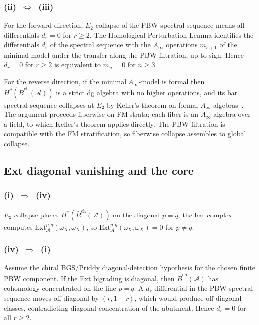 \documentclass[11pt,reqno]{amsart}
\theoremstyle{definition}
\theoremstyle{remark}
\newcommand{\cA}{\mathcal{A}}
\newcommand{\barBgeom}{\bar{B}^{\mathrm{ch}}}
\newcommand{\Ext}{\mathrm{Ext}}
\numberwithin{equation}{section}
\begin{document}
\subsubsection*{\textup{(ii)}~$\Leftrightarrow$~\textup{(iii)}}

For the forward direction, $E_2$-collapse of the PBW spectral
sequence means all differentials $d_r = 0$ for $r \ge 2$. The
Homological Perturbation Lemma identifies the differentials $d_r$
of the spectral sequence with the $A_\infty$ operations
$m_{r+1}$ of the minimal model under the transfer along the
PBW filtration, up to sign. Hence $d_r = 0$ for $r \ge 2$ is
equivalent to $m_n = 0$ for $n \ge 3$.

For the reverse direction, if the minimal $A_\infty$-model is
formal then $H^*(\barBgeom(\cA))$ is a strict dg algebra with no
higher operations, and its bar spectral sequence collapses at
$E_2$ by Keller's theorem on formal
$A_\infty$-algebras~\cite{Keller}. The argument proceeds
fiberwise on FM strata; each fiber is an $A_\infty$-algebra over
a field, to which Keller's theorem applies directly. The PBW
filtration is compatible with the FM stratification, so fiberwise
collapse assembles to global collapse.

\subsection{Ext diagonal vanishing and the core}

\subsubsection*{\textup{(i)}~$\Rightarrow$~\textup{(iv)}}

$E_2$-collapse places $H^*(\barBgeom(\cA))$ on the diagonal
$p = q$; the bar complex computes
$\Ext^{p,q}_\cA(\omega_X,\omega_X)$, so
$\Ext^{p,q}_\cA(\omega_X,\omega_X) = 0$ for $p \neq q$.

\subsubsection*{\textup{(iv)}~$\Rightarrow$~\textup{(i)}}

Assume the chiral BGS/Priddy diagonal-detection hypothesis for
the chosen finite PBW component. If the Ext bigrading is diagonal,
then
$\barBgeom(\cA)$ has cohomology concentrated on the line $p = q$.
A $d_r$-differential in the PBW spectral sequence moves
off-diagonal by $(r, 1-r)$, which would produce off-diagonal
classes, contradicting diagonal concentration of the abutment.
Hence $d_r = 0$ for all $r \ge 2$.
\end{document}

